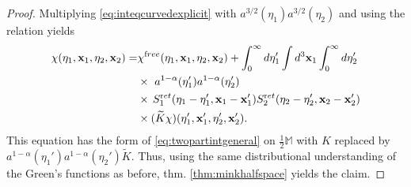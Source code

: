\documentclass[b5paper,draft,openbib,12pt]{memoir}
\newcommand{\M}{\mathbb{M}}
\newcommand{\vx}{\mathbf{x}}
\newcommand{\ret}{{\textup ret}}
\newcommand{\free}{{\textup free}}
\begin{document}
\begin{proof}
	Multiplying \eqref{eq:inteqcurvedexplicit} with $a^{3/2}(\eta_1) a^{3/2}(\eta_2)$ and using the relation yields
	\begin{align}\nonumber
  \chi(\eta_1,\vx_1,\eta_2,\vx_2) =& \chi^\free(\eta_1,\vx_1,\eta_2,\vx_2) +\int_0^\infty d \eta_1' \int d^3 \vx_1 \int_0^\infty d \eta_2'\\
  &\times~a^{1-\alpha}(\eta_1') a^{1-\alpha}(\eta_2') \nonumber\\\nonumber
  &\times  \, S_1^\ret(\eta_1-\eta_1', \vx_1-\vx_1') S_2^\ret(\eta_2-\eta_2',\vx_2-\vx_2') \\
  &\times (\widetilde{K} \chi)(\eta_1',\vx_1',\eta_2',\vx_2').
\label{eq:inteqcurvedexplicit2}
\end{align}
This equation has the form of 
\eqref{eq:twopartintgeneral} on $\frac{1}{2}\M$ with $K$ 
replaced by\linebreak
 $a^{1-\alpha}(\eta_1') a^{1-\alpha}(\eta_2') 
\widetilde{K}$. Thus, using the same distributional 
understanding of the Green's functions as before, thm. 
\ref{thm:minkhalfspace} yields the claim. 
\end{proof}
\end{document}

